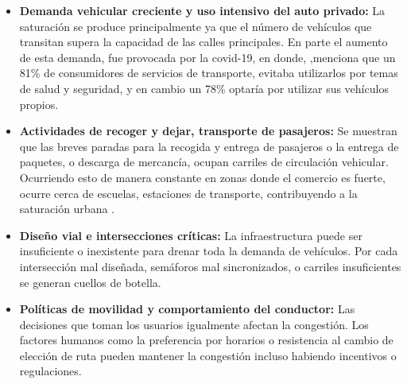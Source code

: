 \begin{itemize}
    \item \textbf{Demanda vehicular creciente y uso intensivo del auto privado:} 
    La saturación se produce principalmente ya que el número de vehículos que 
    transitan supera la capacidad de las calles principales. En parte el aumento 
    de esta demanda, fue provocada por la \acrfull{covid-19}, en donde, \cite{Capgemini_87_2020},menciona que 
    un 81\% de consumidores de servicios de transporte, evitaba utilizarlos por 
    temas de salud y seguridad, y en cambio un 78\% optaría por utilizar sus vehículos propios.
    \item \textbf{Actividades de recoger y dejar, transporte de pasajeros:} 
    Se muestran que las breves paradas para la 
    recogida y entrega de pasajeros o la entrega de paquetes, o descarga de 
    mercancía, ocupan carriles de circulación vehicular. Ocurriendo esto de 
    manera constante en zonas donde el comercio es fuerte, ocurre cerca de 
    escuelas, estaciones de transporte, contribuyendo a la saturación urbana \cite{liu_estimating_2024}.
    \item \textbf{Diseño vial e intersecciones críticas:} La infraestructura puede 
    ser insuficiente o inexistente para drenar toda la demanda de vehículos. 
    Por cada intersección mal diseñada, semáforos mal sincronizados, o carriles 
    insuficientes se generan cuellos de botella.
    \item \textbf{Políticas de movilidad y comportamiento del conductor:} Las decisiones 
    que toman los usuarios igualmente afectan la congestión. Los factores humanos como la 
    preferencia por horarios o resistencia al cambio de elección de ruta pueden mantener la 
    congestión incluso habiendo incentivos o regulaciones. 
\end{itemize}